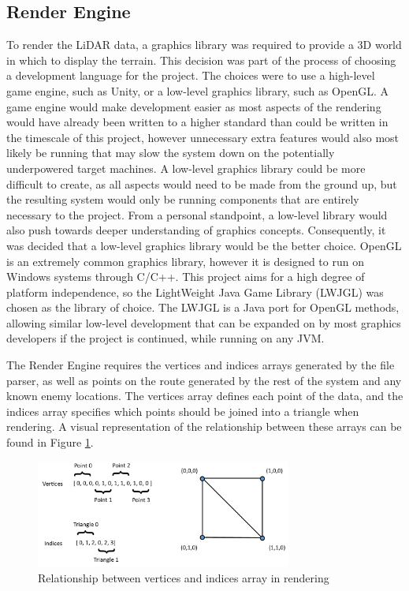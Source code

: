 \documentclass[12pt,a4paper]{article}
\begin{document}
  \subsection{Render Engine}
  \noindent To render the LiDAR data, a graphics library was required to provide a 3D world in which to display the terrain. This decision was part of the process of choosing a development language for the project. The choices were to use a high-level game engine, such as Unity, or a low-level graphics library, such as OpenGL. A game engine would make development easier as most aspects of the rendering would have already been written to a higher standard than could be written in the timescale of this project, however unnecessary extra features would also most likely be running that may slow the system down on the potentially underpowered target machines. A low-level graphics library could be more difficult to create, as all aspects would need to be made from the ground up, but the resulting system would only be running components that are entirely necessary to the project. From a personal standpoint, a low-level library would also push towards deeper understanding of graphics concepts. Consequently, it was decided that a low-level graphics library would be the better choice. OpenGL is an extremely common graphics library, however it is designed to run on Windows systems through C/C++. This project aims for a high degree of platform independence, so the LightWeight Java Game Library (LWJGL) was chosen as the library of choice. The LWJGL is a Java port for OpenGL methods, allowing similar low-level development that can be expanded on by most graphics developers if the project is continued, while running on any JVM.
  \par The Render Engine requires the vertices and indices arrays generated by the file parser, as well as points on the route generated by the rest of the system and any known enemy locations. The vertices array defines each point of the data, and the indices array specifies which points should be joined into a triangle when rendering. A visual representation of the relationship between these arrays can be found in Figure \ref{vertices_indices}.

  \begin{figure}[htb]
    \centering
    \includegraphics[width=0.75\textwidth]{vertices_indices}
    \caption{Relationship between vertices and indices array in rendering}
    \label{vertices_indices}
  \end{figure}
\end{document}
